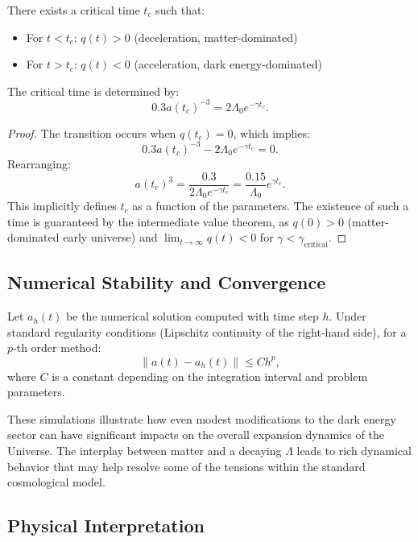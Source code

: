 \begin{proposition}
There exists a critical time $t_c$ such that:
\begin{itemize}
\item For $t < t_c$: $q(t) > 0$ (deceleration, matter-dominated)
\item For $t > t_c$: $q(t) < 0$ (acceleration, dark energy-dominated)
\end{itemize}
The critical time is determined by:
\[
0.3 a(t_c)^{-3} = 2\Lambda_0 e^{-\gamma t_c}.
\]
\end{proposition}

\begin{proof}
The transition occurs when $q(t_c) = 0$, which implies:
\[
0.3 a(t_c)^{-3} - 2\Lambda_0 e^{-\gamma t_c} = 0.
\]
Rearranging:
\[
a(t_c)^3 = \frac{0.3}{2\Lambda_0 e^{-\gamma t_c}} = \frac{0.15}{\Lambda_0} e^{\gamma t_c}.
\]
This implicitly defines $t_c$ as a function of the parameters. The existence of such a time is guaranteed by the intermediate value theorem, as $q(0) > 0$ (matter-dominated early universe) and $\lim_{t \to \infty} q(t) < 0$ for $\gamma < \gamma_{\text{critical}}$.
\end{proof}

\subsection{Numerical Stability and Convergence}

\begin{theorem}
Let $a_h(t)$ be the numerical solution computed with time step $h$. Under standard regularity conditions (Lipschitz continuity of the right-hand side), for a $p$-th order method:
\[
\|a(t) - a_h(t)\| \leq C h^p,
\]
where $C$ is a constant depending on the integration interval and problem parameters.
\end{theorem}

\begin{remark}
These simulations illustrate how even modest modifications to the dark energy sector can have significant impacts on the overall expansion dynamics of the Universe. The interplay between matter and a decaying $\Lambda$ leads to rich dynamical behavior that may help resolve some of the tensions within the standard cosmological model.
\end{remark}

\subsection{Physical Interpretation}

